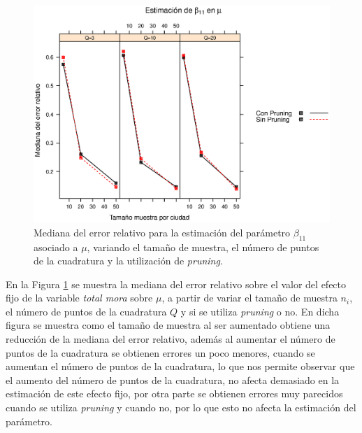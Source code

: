 \begin{figure}
	\begin{center}
		\includegraphics[scale=0.6]{MAPE_beta1_mu.eps}	
		\caption{Mediana del error relativo para la estimaci\'{o}n del par\'{a}metro $\beta_{11}$ asociado a $\mu$, variando el tama\~{n}o de muestra, el n\'{u}mero de puntos de la cuadratura y  la utilizaci\'{o}n de \textit{pruning}.}
		\label{MAPE_beta1_mu}
	\end{center}
\end{figure}

En la Figura \ref{MAPE_beta1_mu} se muestra la mediana del error relativo sobre el valor del efecto fijo de la variable \textsl{total mora} sobre $\mu$, a partir de variar el tama\~{n}o de muestra $n_i$, el n\'{u}mero de puntos de la cuadratura $Q$ y si se utiliza \textit{pruning} o no. En dicha figura se muestra como el tama\~{n}o de muestra al ser aumentado obtiene una reducci\'{o}n de la mediana del error relativo, adem\'{a}s al aumentar el n\'{u}mero de puntos de la cuadratura se obtienen errores un poco menores, cuando se aumentan el n\'{u}mero de puntos de la cuadratura, lo que nos permite observar que el aumento del n\'{u}mero de puntos de la cuadratura, no afecta demasiado en la estimaci\'{o}n de este efecto fijo, por otra parte se obtienen errores muy parecidos cuando se utiliza \textit{pruning} y cuando no, por lo que esto no afecta la estimaci\'{o}n del par\'{a}metro.\\


